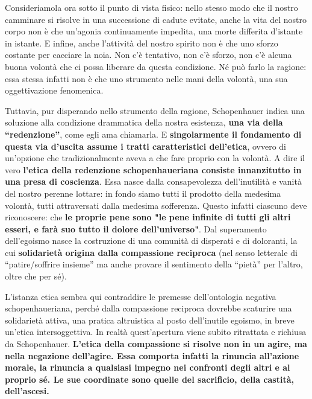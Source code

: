 Consideriamola ora sotto il punto di vista fisico: nello stesso modo che il nostro camminare si risolve in una successione di cadute evitate, anche la vita del nostro corpo non è che un’agonia continuamente impedita, una morte differita d’istante in istante. E infine, anche l’attività del nostro spirito non è che uno sforzo costante per cacciare la noia.  Non c’è tentativo, non c’è sforzo, non c’è alcuna buona volontà che ci possa liberare da questa condizione. Né può farlo la ragione: essa stessa infatti non è che uno strumento nelle mani della volontà, una sua oggettivazione fenomenica.

Tuttavia, pur disperando nello strumento della ragione, Schopenhauer indica una soluzione alla condizione drammatica della nostra esistenza, \textbf{una via della “redenzione”}, come egli ama chiamarla. E \textbf{singolarmente il fondamento di questa via d’uscita assume i tratti caratteristici dell’etica}, ovvero di un’opzione che tradizionalmente aveva a che fare proprio con la volontà. A dire il vero \textbf{l’etica della redenzione schopenhaueriana consiste innanzitutto in una presa di coscienza}. Essa nasce dalla consapevolezza dell’inutilità e vanità del nostro perenne lottare: in fondo siamo tutti il prodotto della medesima volontà, tutti attraversati dalla medesima sofferenza. Questo infatti ciascuno deve riconoscere: che \textbf{le proprie pene sono "le pene infinite di tutti gli altri esseri, e farà suo tutto il dolore dell’universo"}. Dal superamento dell’egoismo nasce la costruzione di una comunità di disperati e di doloranti, la cui \textbf{solidarietà origina dalla compassione reciproca} (nel senso letterale di “patire/soffrire insieme” ma anche provare il sentimento della “pietà” per l’altro, oltre che per sé). 

L’istanza etica sembra qui contraddire le premesse dell’ontologia negativa schopenhaueriana, perché dalla compassione reciproca dovrebbe scaturire una solidarietà attiva, una pratica altruistica al posto dell’inutile egoismo, in breve un’etica intersoggettiva. In realtà quest’apertura viene subito ritrattata e richiusa da Schopenhauer. \textbf{L’etica della compassione si risolve non in un agire, ma nella negazione dell’agire. Essa comporta infatti la rinuncia all’azione morale, la rinuncia a qualsiasi impegno nei confronti degli altri e al proprio sé. Le sue coordinate sono quelle del sacrificio, della castità, dell’ascesi.} 

